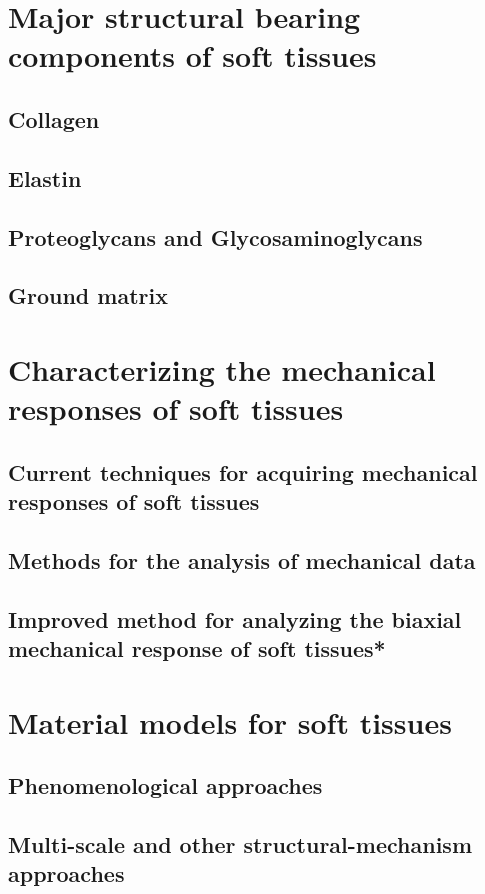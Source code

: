 \section{Major structural bearing components of soft tissues}
\subsection{Collagen}
\subsection{Elastin}
\subsection{Proteoglycans and Glycosaminoglycans}
\subsection{Ground matrix}

\section{Characterizing the mechanical responses of soft tissues}
\subsection{Current techniques for acquiring mechanical responses of soft tissues}
\subsection{Methods for the analysis of mechanical data}
\subsection{Improved method for analyzing the biaxial mechanical response of soft tissues*}

\section{Material models for soft tissues}
\subsection{Phenomenological approaches}
\subsection{Multi-scale and other structural-mechanism approaches}
